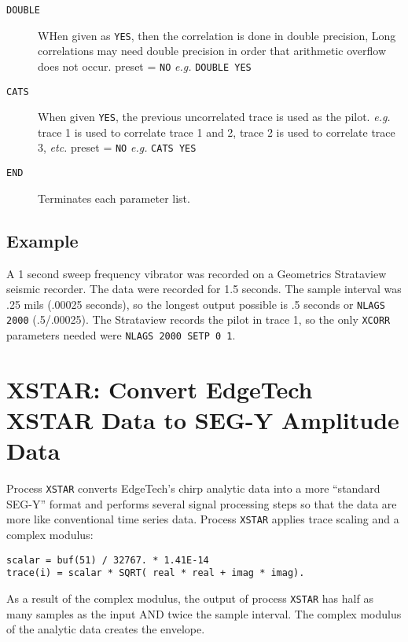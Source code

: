 \begin{description}
\item[\texttt{DOUBLE}] WHen given as \texttt{YES}, then the correlation is done in double
         precision,  Long correlations may need double precision
         in order that arithmetic overflow does not occur.
         \Gls{preset} = \texttt{NO}     \textit{e.g.} \texttt{DOUBLE YES}

\item[\texttt{CATS}] When given \texttt{YES}, the previous uncorrelated trace is used as
         the pilot.  \textit{e.g.} trace 1 is used to correlate trace 1 and 2,
         trace 2 is used to correlate trace 3, \textit{etc.}
         \Gls{preset} = \texttt{NO}   \textit{e.g.}  \texttt{CATS YES}

\item[\texttt{END}] Terminates each parameter list.
\end{description}

\subsection{Example}

A 1 second sweep frequency vibrator was recorded on a Geometrics
Strataview seismic recorder.  The data were recorded for 1.5 seconds.
The sample interval was .25 mils (.00025 seconds), so the longest
output possible is .5 seconds or \texttt{NLAGS 2000} (.5/.00025).
The Strataview records the pilot in trace 1, so the only \texttt{XCORR}
parameters needed were  \texttt{NLAGS 2000 SETP 0 1}.

\section{XSTAR: Convert EdgeTech XSTAR Data to SEG-Y Amplitude Data}
\label{cmd_xstar}

     Process \texttt{XSTAR} converts EdgeTech's chirp analytic data into a
more ``standard SEG-Y'' format and performs several signal processing
steps so that the data are more like conventional time series data.
Process \texttt{XSTAR} applies trace scaling and a complex modulus:
\begin{verbatim}
scalar = buf(51) / 32767. * 1.41E-14
trace(i) = scalar * SQRT( real * real + imag * imag).
\end{verbatim}
     As a result of the complex modulus, the output of process \texttt{XSTAR}
has half as many samples as the input AND twice the sample interval.
The complex modulus of the analytic data creates the envelope.

